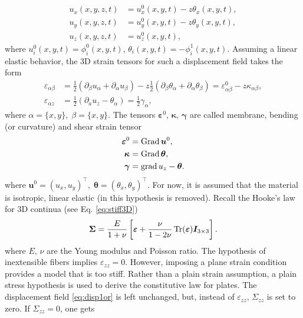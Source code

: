 \begin{equation}\label{eq:disp1or}
\begin{aligned}
u_x(x,y,z,t) &= u_x^0(x,y,t) -z \theta_x(x,y,t), \\
u_y(x,y,z,t) &= u_y^0(x,y,t) -z \theta_y(x,y,t), \\
u_z(x,y,z,t) &= u_z^0(x,y,t), 
\end{aligned}
\end{equation}
where $u_i^0(x,y,t) = \phi_i^0(x,y,t), \, \theta_i(x,y,t) = -\phi_i^1(x,y,t)$. Assuming a linear elastic behavior, the 3D strain tensors for such a displacement field takes the form
\begin{align}
\varepsilon_{\alpha \beta} &= \frac{1}{2} \left(\partial_\beta u_\alpha + \partial_\alpha u_\beta \right) - z \frac{1}{2} \left(\partial_\beta \theta_\alpha + \partial_\alpha \theta_\beta \right) = {\varepsilon}^0_{\alpha \beta} - z \kappa_{\alpha \beta}, \label{eq:eps_inplane}\\
\varepsilon_{\alpha z} &= \frac{1}{2} \left(\partial_a u_z - \theta_\alpha \right) = \frac{1}{2} \gamma_\alpha,
\end{align}
where $\alpha=\{x,y\}, \; \beta=\{x,y\}$. The tensors $\bm{\varepsilon}^0,\, \bm{\kappa},\, \bm{\gamma}$ are called membrane, bending (or curvature) and shear strain tensor
\begin{align}
\bm{\varepsilon}^0 &= \operatorname*{Grad} \bm{u}^0, \label{eq:eps0} \\
\bm{\kappa} &= \operatorname*{Grad} \bm{\theta}, \label{eq:kappa}  \\
\bm{\gamma} &= \operatorname*{grad} u_z - \bm{\theta}. \label{eq:gamma}
\end{align}
where $\bm{u}^0 = (u_x, u_y)^\top, \; \bm{\theta} = (\theta_x, \theta_y)^\top$. For now, it is assumed that the material is isotropic, linear elastic (in  this hypothesis is removed). Recall the Hooke's law for 3D continua (see Eq. \eqref{eq:stiff3D})
\begin{equation*}
\bm{\Sigma} = \frac{E}{1+\nu} \left[\bm{\varepsilon} + \frac{\nu}{1-2\nu} \operatorname{Tr}(\bm{\varepsilon})\bm{I}_{3\times 3} \right].
\end{equation*}
where $E,\, \nu$ are the Young modulus and Poisson ratio. The hypothesis of inextensible fibers implies $\varepsilon_{zz}=0$. However, imposing a plane strain condition provides a model that is too stiff. Rather than a plain strain assumption, a plain stress hypothesis is used to derive the constitutive law for plates. The displacement field \eqref{eq:disp1or} is left unchanged, but, instead of $\varepsilon_{zz}$, $\Sigma_{zz}$ is set to zero. If $\Sigma_{zz}=0$, one gets
